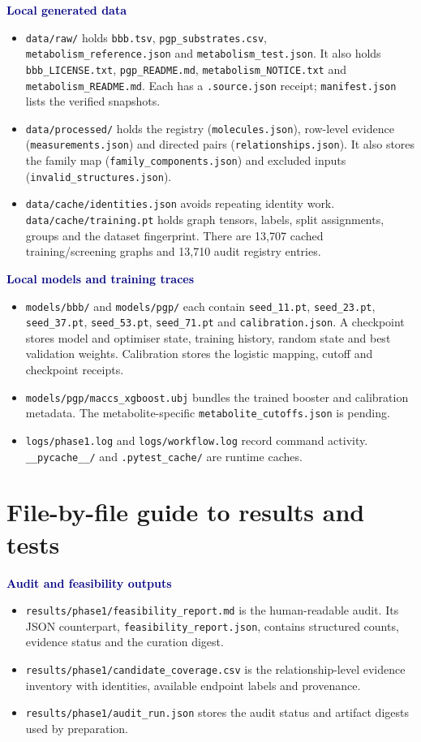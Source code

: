 \documentclass[11pt,a4paper]{article}
\newcommand{\code}[1]{\nolinkurl{#1}}
\newcommand{\lead}[1]{\par\smallskip\textbf{\textcolor{Navy}{#1}}\par\nobreak}
\newcommand{\pagehead}[1]{\clearpage\section{#1}}
\newenvironment{compact}{\begin{itemize}[leftmargin=*,topsep=2pt,itemsep=1pt,parsep=0pt]}{\end{itemize}}
\begin{document}
\lead{Local generated data}
\begin{compact}
\item \code{data/raw/} holds \code{bbb.tsv}, \code{pgp_substrates.csv}, \code{metabolism_reference.json} and \code{metabolism_test.json}. It also holds \code{bbb_LICENSE.txt}, \code{pgp_README.md}, \code{metabolism_NOTICE.txt} and \code{metabolism_README.md}. Each has a \code{.source.json} receipt; \code{manifest.json} lists the verified snapshots.
\item \code{data/processed/} holds the registry (\code{molecules.json}), row-level evidence (\code{measurements.json}) and directed pairs (\code{relationships.json}). It also stores the family map (\code{family_components.json}) and excluded inputs (\code{invalid_structures.json}).
\item \code{data/cache/identities.json} avoids repeating identity work. \code{data/cache/training.pt} holds graph tensors, labels, split assignments, groups and the dataset fingerprint. There are 13,707 cached training/screening graphs and 13,710 audit registry entries.
\end{compact}

\lead{Local models and training traces}
\begin{compact}
\item \code{models/bbb/} and \code{models/pgp/} each contain \code{seed_11.pt}, \code{seed_23.pt}, \code{seed_37.pt}, \code{seed_53.pt}, \code{seed_71.pt} and \code{calibration.json}. A checkpoint stores model and optimiser state, training history, random state and best validation weights. Calibration stores the logistic mapping, cutoff and checkpoint receipts.
\item \code{models/pgp/maccs_xgboost.ubj} bundles the trained booster and calibration metadata. The metabolite-specific \code{metabolite_cutoffs.json} is pending.
\item \code{logs/phase1.log} and \code{logs/workflow.log} record command activity. \code{__pycache__/} and \code{.pytest_cache/} are runtime caches.
\end{compact}

\pagehead{File-by-file guide to results and tests}
\lead{Audit and feasibility outputs}
\begin{compact}
\item \code{results/phase1/feasibility_report.md} is the human-readable audit. Its JSON counterpart, \code{feasibility_report.json}, contains structured counts, evidence status and the curation digest.
\item \code{results/phase1/candidate_coverage.csv} is the relationship-level evidence inventory with identities, available endpoint labels and provenance.
\item \code{results/phase1/audit_run.json} stores the audit status and artifact digests used by preparation.
\end{compact}
\end{document}
